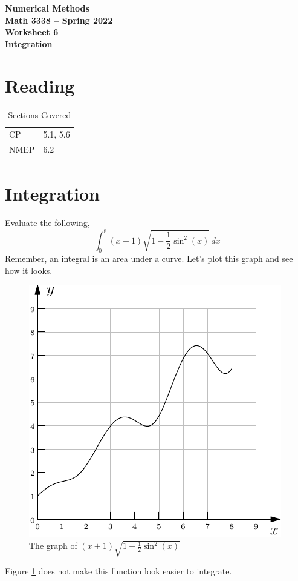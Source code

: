 \documentclass[11pt,letterpaper]{article}
\newcommand{\semester}{Spring 2022}
\begin{document}
\begin{center}
{\huge{\bf  Numerical Methods}} \\[1.5ex]
{\bf Math 3338 -- \semester}\\[1.5ex]
{\Large{\bf Worksheet 6\ \\[2ex] Integration}}\\
\end{center}
\vspace{2mm}

\section{Reading}

\begin{table}[!ht]
 \centering
 \begin{tabular}{ll}
   CP & 5.1, 5.6 \\
 NMEP & 6.2
 \end{tabular}
\caption{Sections Covered}
\end{table}



\section{Integration}

Evaluate the following,
\[
 \int_0^8(x+1)\sqrt{1-\frac{1}{2}\sin^2(x)}\,dx
\]
Remember, an integral is an area under a curve. Let's plot this graph and see how it looks. 
\begin{figure}[!ht]
 \centering
 \includegraphics{images/fun.pdf}
 \caption{The graph of $(x+1)\sqrt{1-\frac12\sin^2(x)}$}
 \label{fig:fun}
\end{figure}
Figure \ref{fig:fun} does not make this function look easier to integrate.
\end{document}

